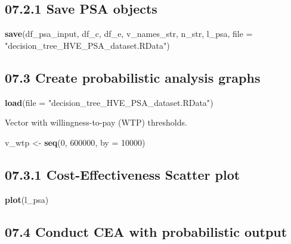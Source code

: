 \documentclass[]{article}
\newenvironment{Shaded}{\begin{snugshade}}{\end{snugshade}}
\newcommand{\KeywordTok}[1]{\textcolor[rgb]{0.13,0.29,0.53}{\textbf{#1}}}
\newcommand{\DataTypeTok}[1]{\textcolor[rgb]{0.13,0.29,0.53}{#1}}
\newcommand{\DecValTok}[1]{\textcolor[rgb]{0.00,0.00,0.81}{#1}}
\newcommand{\StringTok}[1]{\textcolor[rgb]{0.31,0.60,0.02}{#1}}
\newcommand{\NormalTok}[1]{#1}
\begin{document}
\subsection{07.2.1 Save PSA objects}\label{save-psa-objects}

\begin{Shaded}
\begin{Highlighting}[]
\KeywordTok{save}\NormalTok{(df_psa_input, df_c, df_e, v_names_str, n_str,}
\NormalTok{     l_psa,}
     \DataTypeTok{file =} \StringTok{"decision_tree_HVE_PSA_dataset.RData"}\NormalTok{)}
\end{Highlighting}
\end{Shaded}

\subsection{07.3 Create probabilistic analysis
graphs}\label{create-probabilistic-analysis-graphs}

\begin{Shaded}
\begin{Highlighting}[]
\KeywordTok{load}\NormalTok{(}\DataTypeTok{file =} \StringTok{"decision_tree_HVE_PSA_dataset.RData"}\NormalTok{)}
\end{Highlighting}
\end{Shaded}

Vector with willingness-to-pay (WTP) thresholds.

\begin{Shaded}
\begin{Highlighting}[]
\NormalTok{v_wtp <-}\StringTok{ }\KeywordTok{seq}\NormalTok{(}\DecValTok{0}\NormalTok{, }\DecValTok{600000}\NormalTok{, }\DataTypeTok{by =} \DecValTok{10000}\NormalTok{)}
\end{Highlighting}
\end{Shaded}

\subsection{07.3.1 Cost-Effectiveness Scatter
plot}\label{cost-effectiveness-scatter-plot}

\begin{Shaded}
\begin{Highlighting}[]
\KeywordTok{plot}\NormalTok{(l_psa)}
\end{Highlighting}
\end{Shaded}

\subsection{07.4 Conduct CEA with probabilistic
output}\label{conduct-cea-with-probabilistic-output}
\end{document}

